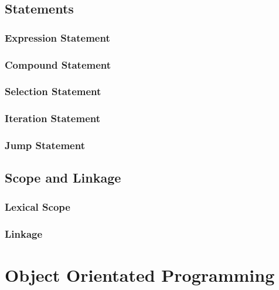 \documentclass[12pt]{report}
\begin{document}
\subsection{Statements}

\subsubsection{Expression Statement}
\subsubsection{Compound Statement}
\subsubsection{Selection Statement}
\subsubsection{Iteration Statement}
\subsubsection{Jump Statement}

\begin{doublespace}
\end{doublespace}

\subsection{Scope and Linkage}

\subsubsection{Lexical Scope}
\subsubsection{Linkage}

\begin{doublespace}
\end{doublespace}


\section{Object Orientated Programming}

\begin{doublespace}
\end{doublespace}
\end{document}
